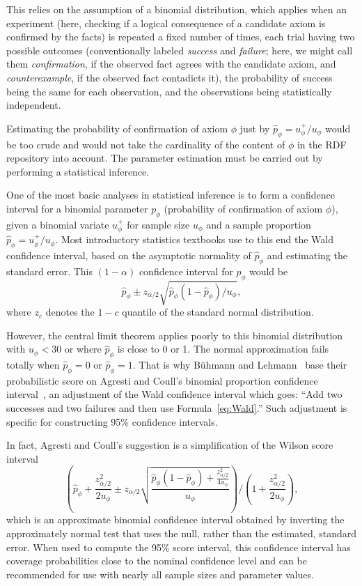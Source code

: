 \documentclass[review]{elsarticle}
\theoremstyle{definition}
\begin{document}
This relies on the assumption of a binomial distribution, which applies when an
experiment (here, checking if a logical consequence of a candidate axiom is confirmed
by the facts) is repeated a fixed number of times, each trial having two possible outcomes
(conventionally labeled \emph{success} and \emph{failure}; here, we might call them
\emph{confirmation}, if the observed fact agrees with the candidate axiom,
and \emph{counterexample}, if the observed fact contadicts it),
the probability of success being the same for each observation,
and the observations being statistically independent.

Estimating the probability of confirmation of axiom $\phi$ just by $\hat{p}_\phi = u_\phi^+/u_\phi$
would be too crude and would not take the cardinality of the content of $\phi$
in the RDF repository into account.
The parameter estimation must be carried out by performing a statistical inference.

One of the most basic analyses in statistical inference is to form a confidence interval
for a binomial parameter $p_\phi$ (probability of confirmation of axiom $\phi$), given
a binomial variate $u_\phi^+$ for sample size $u_\phi$ and a sample proportion $\hat{p}_\phi = u_\phi^+/u_\phi$.
Most introductory statistics textbooks use to this end the Wald confidence interval,
based on the asymptotic normality of $\hat{p}_\phi$ and estimating the standard error.
This $(1 - \alpha)$ confidence interval for $p_\phi$ would be
\begin{equation}\label{eq:Wald}
  \hat{p}_\phi \pm z_{\alpha/2}\sqrt{\hat{p}_\phi(1 - \hat{p}_\phi)/u_\phi},
\end{equation}
where $z_c$ denotes the $1 - c$ quantile of the standard normal distribution.

However, the central limit theorem applies poorly to this binomial distribution
with $u_\phi<30$ or where $\hat{p}_\phi$ is close to 0 or 1.
The normal approximation fails totally when $\hat{p}_\phi = 0$ or $\hat{p}_\phi = 1$.
That is why B\"uhmann and Lehmann~\cite{BuehmannLehmann2012} base their probabilistic score
on Agresti and Coull's binomial proportion confidence interval~\cite{AgrestiCoull1998},
an adjustment of the Wald confidence interval which goes: ``Add two successes and two failures
and then use Formula~\ref{eq:Wald}.'' Such adjustment is specific for constructing
95\% confidence intervals.

In fact, Agresti and Coull's suggestion is a simplification of the Wilson score interval
\begin{equation}
  \left(
    \hat{p}_\phi + \frac{z_{\alpha/2}^2}{2u_\phi} \pm
    z_{\alpha/2}\sqrt{\frac{\hat{p}_\phi(1 - \hat{p}_\phi) + \frac{z_{\alpha/2}^2}{4u_\phi}}{u_\phi}}
  \right) / \left(1 + \frac{z_{\alpha/2}^2}{2u_\phi}\right),
\end{equation}
which is an approximate binomial confidence interval obtained by inverting the approximately
normal test that uses the null, rather than the estimated, standard error.
When used to compute the 95\% score interval, this confidence interval
has coverage probabilities close to the nominal confidence level and can be recommended
for use with nearly all sample sizes and parameter values.
\end{document}
